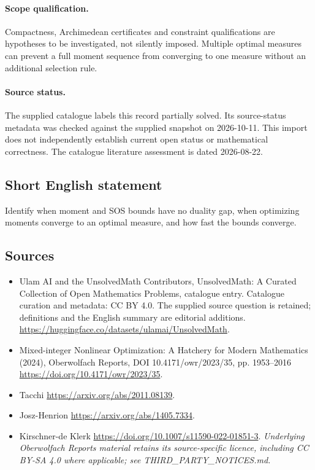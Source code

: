 \documentclass[11pt]{article}
\begin{document}
\paragraph{Scope qualification.}
Compactness, Archimedean certificates and constraint qualifications are hypotheses to be investigated, not silently imposed. Multiple optimal measures can prevent a full moment sequence from converging to one measure without an additional selection rule.
\paragraph{Source status.}
The supplied catalogue labels this record partially solved. Its source-status metadata was checked against the supplied snapshot on 2026-10-11. This import does not independently establish current open status or mathematical correctness. The catalogue literature assessment is dated 2026-08-22.
\subsection{Short English statement}
Identify when moment and SOS bounds have no duality gap, when optimizing moments converge to an optimal measure, and how fast the bounds converge.
\subsection{Sources}
\begin{itemize}
\item[S1] Ulam AI and the UnsolvedMath Contributors, UnsolvedMath: A Curated Collection of Open Mathematics Problems, catalogue entry. Catalogue curation and metadata: CC BY 4.0. The supplied source question is retained; definitions and the English summary are editorial additions.
\url{https://huggingface.co/datasets/ulamai/UnsolvedMath}.
\item[S2] Mixed-integer Nonlinear Optimization: A Hatchery for Modern Mathematics (2024), Oberwolfach Reports, DOI 10.4171/owr/2023/35, pp. 1953--2016
\url{https://doi.org/10.4171/owr/2023/35}.
\item[S3] Tacchi
\url{https://arxiv.org/abs/2011.08139}.
\item[S4] Josz-Henrion
\url{https://arxiv.org/abs/1405.7334}.
\item[S5] Kirschner-de Klerk
\url{https://doi.org/10.1007/s11590-022-01851-3}.
\textit{Underlying Oberwolfach Reports material retains its source-specific licence, including CC BY-SA 4.0 where applicable; see THIRD\_PARTY\_NOTICES.md.}
\end{itemize}
\end{document}
